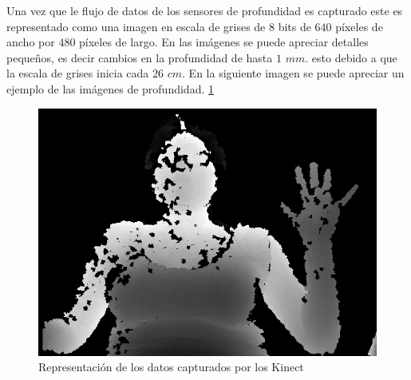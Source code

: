 Una vez que le flujo de datos de los sensores de profundidad es capturado este es representado como una imagen en escala de grises de $8$ bits de $640$ p\'ixeles de ancho por $480$ p\'ixeles de largo. En las imágenes se puede apreciar detalles pequeños, es decir cambios en la profundidad de hasta $1$  $mm.$ esto debido a que la escala de grises inicia cada $26$  $cm$. 
En la siguiente imagen se puede apreciar un ejemplo de las imágenes de profundidad. \ref{fig:ImagenCapturada}

\begin{figure}[h!]
\begin{center}
\includegraphics[scale=.5]{./Figures/166.png}
\end{center}
\caption{Representación de los datos capturados por los Kinect}
\label{fig:ImagenCapturada}
\end{figure}  

